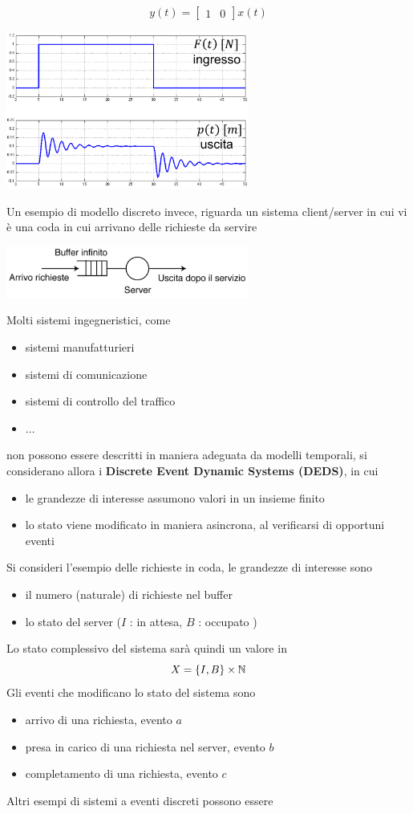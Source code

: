 \documentclass[10pt, letterpaper]{report}
\begin{document}
$$ y(t)=\begin{bmatrix}
    1 & 0
\end{bmatrix}x(t)$$\begin{center}
    \includegraphics[width=0.6\textwidth]{images/mollaMassa2.png}
\end{center}
Un esempio di modello discreto invece, riguarda un sistema client/server in cui vi è una coda in cui arrivano delle richieste da servire\begin{center}
    \includegraphics[width=0.6\textwidth]{images/DEDScoda.png}
\end{center}
Molti sistemi ingegneristici, come\begin{itemize}
    \item sistemi manufatturieri 
    \item sistemi di comunicazione 
    \item sistemi di controllo del traffico 
    \item $\dots$
\end{itemize} non possono essere descritti in maniera adeguata da modelli temporali, si considerano allora i \textbf{Discrete Event Dynamic Systems (DEDS)}, in cui \begin{itemize}
    \item le grandezze di interesse assumono valori in un insieme finito 
    \item lo stato viene modificato in maniera asincrona, al verificarsi di opportuni eventi 
\end{itemize}
Si consideri l'esempio delle richieste in coda, le grandezze di interesse sono\begin{itemize}
    \item il numero (naturale) di richieste nel buffer 
    \item lo stato del server ($I$ : in attesa, $B$ : occupato )
\end{itemize}
Lo stato complessivo del sistema sarà quindi un valore in 
$$ X=\{I,B\}\times {\mathbb N}$$
Gli eventi che modificano lo stato del sistema sono \begin{itemize}
    \item arrivo di una richiesta, evento $a$
    \item presa in carico di una richiesta nel server, evento $b$
    \item completamento di una richiesta, evento $c$
\end{itemize}
Altri esempi di sistemi a eventi discreti possono essere 
\end{document}
